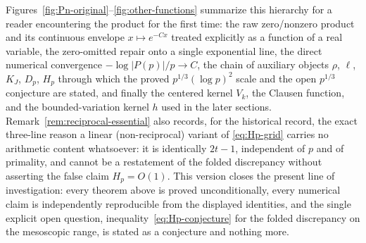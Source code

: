 \documentclass[11pt]{amsart}
\numberwithin{equation}{section}
\theoremstyle{definition}
\theoremstyle{remark}
\begin{document}
Figures~\ref{fig:Pn-original}--\ref{fig:other-functions} summarize this
hierarchy for a reader encountering the product for the first time: the
raw zero/nonzero product and its continuous envelope \(x\mapsto e^{-Cx}\)
treated explicitly as a function of a real variable, the zero-omitted
repair onto a single exponential line, the direct numerical convergence
\(-\log|P(p)|/p\to C\), the chain of auxiliary objects \(\rho\), \(\ell\),
\(K_J\), \(D_p\), \(H_p\) through which the proved \(p^{1/3}(\log p)^2\)
scale and the open \(p^{1/3}\) conjecture are stated, and finally the
centered kernel \(V_k\), the Clausen function, and the bounded-variation
kernel \(h\) used in the later sections.
Remark~\ref{rem:reciprocal-essential} also records, for the historical
record, the exact three-line reason a linear (non-reciprocal) variant of
\eqref{eq:Hp-grid} carries no arithmetic content whatsoever: it is
identically \(2t-1\), independent of \(p\) and of primality, and cannot
be a restatement of the folded discrepancy without asserting the false
claim \(H_p=O(1)\). This version closes the
present line of investigation: every theorem above is proved
unconditionally, every numerical claim is independently reproducible from
the displayed identities, and the single explicit open question,
inequality~\eqref{eq:Hp-conjecture} for the folded discrepancy on the
mesoscopic range, is stated as a conjecture and nothing more.
\end{document}
